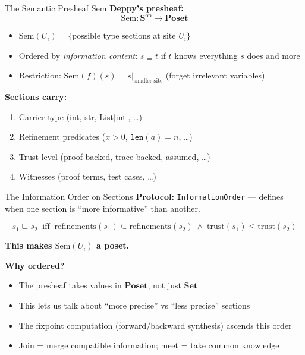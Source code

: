 \documentclass[aspectratio=169,10pt]{beamer}
\newcommand{\Sem}{\mathrm{Sem}}
\newcommand{\op}{\mathrm{op}}
\newcommand{\Poset}{\mathbf{Poset}}
\newcommand{\Set}{\mathbf{Set}}
\begin{document}
\begin{frame}{The Semantic Presheaf $\Sem$}
\textbf{Deppy's presheaf:}
\[
\Sem : \mathbf{S}^{\op} \to \Poset
\]

\begin{itemize}
  \item $\Sem(U_i) = \{\text{possible type sections at site } U_i\}$
  \item Ordered by \emph{information content}: $s \sqsubseteq t$ if $t$ knows everything $s$ does and more
  \item Restriction: $\Sem(f)(s) = s|_{\text{smaller site}}$ (forget irrelevant variables)
\end{itemize}

\vspace{0.3em}
\textbf{Sections carry:}
\begin{enumerate}
  \item Carrier type (int, str, List[int], \ldots)
  \item Refinement predicates ($x > 0$, $\texttt{len}(a) = n$, \ldots)
  \item Trust level (proof-backed, trace-backed, assumed, \ldots)
  \item Witnesses (proof terms, test cases, \ldots)
\end{enumerate}
\end{frame}

\begin{frame}{The Information Order on Sections}
\textbf{Protocol:} \texttt{InformationOrder} --- defines when one section is ``more informative'' than another.

\[
s_1 \sqsubseteq s_2 \;\;\text{iff}\;\; \text{refinements}(s_1) \subseteq \text{refinements}(s_2) \;\wedge\; \text{trust}(s_1) \leq \text{trust}(s_2)
\]

\textbf{This makes $\Sem(U_i)$ a poset.}

\vspace{0.3em}
\textbf{Why ordered?}
\begin{itemize}
  \item The presheaf takes values in $\Poset$, not just $\Set$
  \item This lets us talk about ``more precise'' vs ``less precise'' sections
  \item The fixpoint computation (forward/backward synthesis) ascends this order
  \item Join = merge compatible information; meet = take common knowledge
\end{itemize}
\end{frame}
\end{document}
